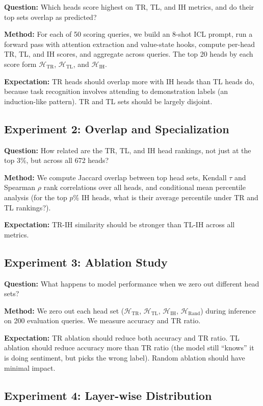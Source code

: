 \documentclass[twoside,english]{article}
\begin{document}
\textbf{Question:} Which heads score highest on TR, TL, and IH metrics, and do their top sets overlap as predicted?

\textbf{Method:} For each of 50 scoring queries, we build an 8-shot ICL prompt, run a forward pass with attention extraction and value-state hooks, compute per-head TR, TL, and IH scores, and aggregate across queries. The top 20 heads by each score form $\mathcal{H}_{\text{TR}}$, $\mathcal{H}_{\text{TL}}$, and $\mathcal{H}_{\text{IH}}$.

\textbf{Expectation:} TR heads should overlap more with IH heads than TL heads do, because task recognition involves attending to demonstration labels (an induction-like pattern). TR and TL sets should be largely disjoint.

\subsection{Experiment 2: Overlap and Specialization}

\textbf{Question:} How related are the TR, TL, and IH head rankings, not just at the top 3\%, but across all 672 heads?

\textbf{Method:} We compute Jaccard overlap between top head sets, Kendall $\tau$ and Spearman $\rho$ rank correlations over all heads, and conditional mean percentile analysis (for the top $p$\% IH heads, what is their average percentile under TR and TL rankings?).

\textbf{Expectation:} TR-IH similarity should be stronger than TL-IH across all metrics.

\subsection{Experiment 3: Ablation Study}

\textbf{Question:} What happens to model performance when we zero out different head sets?

\textbf{Method:} We zero out each head set ($\mathcal{H}_{\text{TR}}$, $\mathcal{H}_{\text{TL}}$, $\mathcal{H}_{\text{IH}}$, $\mathcal{H}_{\text{Rand}}$) during inference on 200 evaluation queries. We measure accuracy and TR ratio.

\textbf{Expectation:} TR ablation should reduce both accuracy and TR ratio. TL ablation should reduce accuracy more than TR ratio (the model still ``knows'' it is doing sentiment, but picks the wrong label). Random ablation should have minimal impact.

\subsection{Experiment 4: Layer-wise Distribution}
\end{document}
